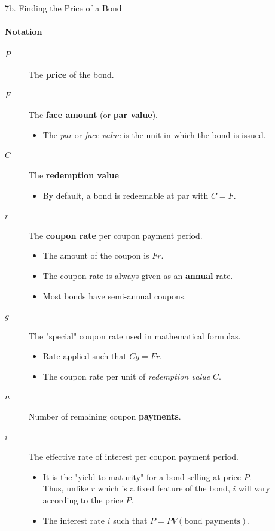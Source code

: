 \begin{CHPT_SUMM_AUTO}[label = {L.-7b}]{7b. Finding the Price of a Bond}
\paragraph*{Notation}
\begin{description}
	\item[$P$]	The \textbf{price} of the bond.
	\item[$F$]	The \textbf{face amount} (or \textbf{par value}).
		\begin{itemize}[leftmargin = *]
		\item	The \textit{par} or \textit{face value} is the unit in which the bond is issued.	
		\end{itemize}
	\item[$C$]	The \textbf{redemption value}
		\begin{itemize}[leftmargin = *]
		\item	By default, a bond is redeemable at par with $C = F$.
		\end{itemize}
	\item[$r$]	The \textbf{coupon rate} per coupon payment period.
		\begin{itemize}[leftmargin = *]
		\item	The amount of the coupon is $Fr$.
		\item	The coupon rate is always given as an \textbf{annual} rate.
		\item	Most bonds have semi-annual coupons.
		\end{itemize}
	\item[$g$]	The "special" coupon rate used in mathematical formulas.
		\begin{itemize}[leftmargin = *]
		\item	Rate applied such that $Cg = Fr$.
		\item	The coupon rate per unit of \textit{redemption value} $C$.
		\end{itemize}
	\item[$n$]	Number of remaining coupon \textbf{payments}.
	\item[$i$]	The effective rate of interest per coupon payment period.
		\begin{itemize}[leftmargin = *]
		\item	It is the "yield-to-maturity" for a bond selling at price $P$.\\
				Thus, unlike $r$ which is a fixed feature of the bond, $i$ will vary according to the price $P$.
		\item	The interest rate $i$ such that $P = PV(\text{bond payments})$.
		\end{itemize}
\end{description}


\end{CHPT_SUMM_AUTO}
